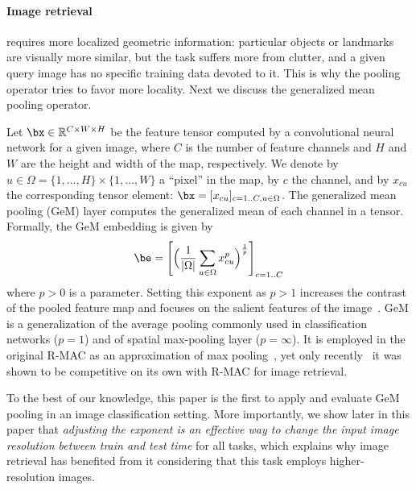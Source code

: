 

\paragraph{Image retrieval}\hspace{-1em} requires more localized geometric information: particular objects or landmarks are visually more similar, but the task suffers more from clutter, and a given query image has no specific training data devoted to it. This is why the pooling operator tries to favor more locality. Next we discuss the generalized mean pooling operator. 

%
Let $\bx\in\mathbb{R}^{C\times W \times H}$ be the feature tensor computed by a convolutional neural network for a given image, where $C$ is the number of feature channels and $H$ and $W$ are the height and width of the map, respectively. 
We denote by $u\in\Omega=\{1,\dots,H\}\times\{1,\dots,W\}$ a ``pixel'' in the map, by $c$ the channel, and by $x_{cu}$ the corresponding tensor element: $\bx=[x_{cu}]_{c=1..C,u\in\Omega}$.
%
The generalized mean pooling (GeM) layer computes the generalized mean of each channel in a tensor.
Formally, the GeM embedding is given by
\begin{equation}\label{eq:gem}
 \be
 =
 \left[
 \Big(\frac{1}{|\Omega|}
 \sum_{u\in \Omega}x^p_{cu}
\Big)^\frac{1}{p}
 \right]_{c=1..C}
\end{equation}
where $p > 0$ is a parameter. Setting this exponent as $p>1$ increases the contrast of the pooled feature map and focuses on the salient features of the image~\cite{Bo2009EfficientMK,Boureau2010ATA,dollar2009integral}. 
%
GeM is a generalization of the average pooling commonly used in classification networks ($p=1$) and of spatial max-pooling layer ($p=\infty$). 
It is employed in the original R-MAC as an approximation of max pooling~\cite{dollar2009integral}, yet only recently~\cite{radenovic2018fine} it was shown to be competitive on its own with R-MAC for image retrieval.

%
To the best of our knowledge, this paper is the first to apply and evaluate GeM pooling in an image classification setting.
More importantly, we show later in this paper that \emph{adjusting the exponent is an effective way to change the input image resolution between train and test time} for all tasks, which explains why image retrieval has benefited from it considering that this task employs higher-resolution images. 

%
%
%
%
%
%
%
%
%
%
%
%
%
%
%
%
%

